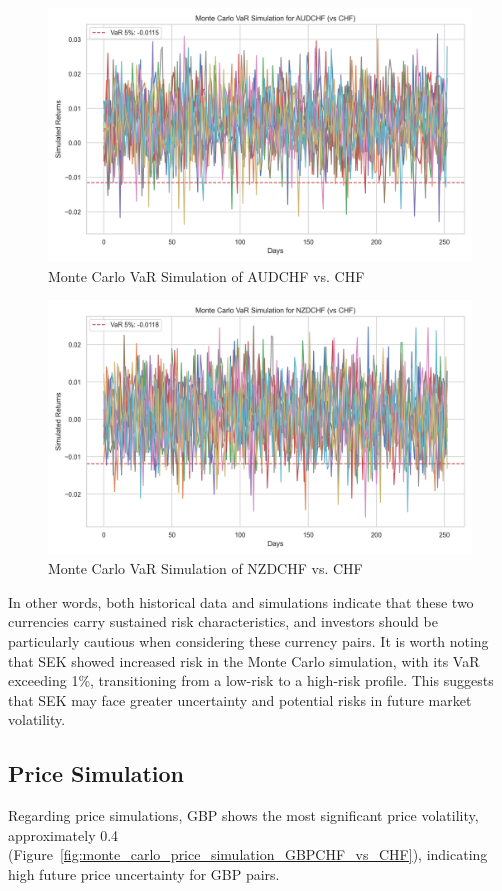\documentclass{article}
\begin{document}
\begin{figure}[H]
    \centering   
    \includegraphics[width=0.75\linewidth]{reports/figures/monte_carlo_var_simulation_AUDCHF_vs_CHF.png}
    \caption{Monte Carlo VaR Simulation of AUDCHF vs. CHF}  \label{fig:monte_carlo_var_simulation_AUDCHF_vs_CHF}
\end{figure}

\begin{figure}[h]
    \centering   \includegraphics[width=0.75\linewidth]{reports/figures/monte_carlo_var_simulation_NZDCHF_vs_CHF.png}
    \caption{Monte Carlo VaR Simulation of NZDCHF vs. CHF}  \label{fig:monte_carlo_var_simulation_NZDCHF_vs_CHF}
\end{figure}

In other words, both historical data and simulations indicate that these two currencies carry sustained risk characteristics, and investors should be particularly cautious when considering these currency pairs. It is worth noting that SEK showed increased risk in the Monte Carlo simulation, with its VaR exceeding 1\%, transitioning from a low-risk to a high-risk profile. This suggests that SEK may face greater uncertainty and potential risks in future market volatility.

\subsection{Price Simulation}
Regarding price simulations, GBP shows the most significant price volatility, approximately 0.4 (Figure~\ref{fig:monte_carlo_price_simulation_GBPCHF_vs_CHF}), indicating high future price uncertainty for GBP pairs. 
\end{document}
